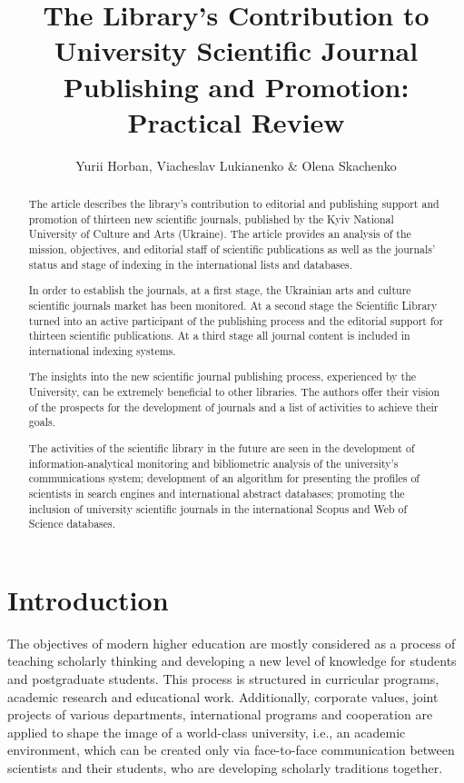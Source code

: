 \documentclass[a4paper,
fontsize=11pt,
oneside,
numbers=noperiodatend,
parskip=half-,
bibliography=totoc,
final
]{scrartcl}
\title{\LARGE{The Library’s Contribution to University Scientific Journal Publishing and Promotion: Practical Review}}%
\author{Yurii Horban, Viacheslav Lukianenko \& Olena Skachenko} %
\date{}
\begin{document}
\maketitle
\thispagestyle{fancyplain} 

\begin{abstract}
\noindent
The article describes the library's contribution to editorial and
publishing support and promotion of thirteen new scientific journals,
published by the Kyiv National University of Culture and Arts (Ukraine).
The article provides an analysis of the mission, objectives, and
editorial staff of scientific publications as well as the journals'
status and stage of indexing in the international lists and databases.

In order to establish the journals, at a first stage, the Ukrainian arts
and culture scientific journals market has been monitored. At a second
stage the Scientific Library turned into an active participant of the
publishing process and the editorial support for thirteen scientific
publications. At a third stage all journal content is included in
international indexing systems.

The insights into the new scientific journal publishing process,
experienced by the University, can be extremely beneficial to other
libraries. The authors offer their vision of the prospects for the
development of journals and a list of activities to achieve their goals.

The activities of the scientific library in the future are seen in the
development of information-analytical monitoring and bibliometric
analysis of the university's communications system; development of an
algorithm for presenting the profiles of scientists in search engines
and international abstract databases; promoting the inclusion of
university scientific journals in the international Scopus and Web of
Science databases.
\end{abstract}

\hypertarget{introduction}{%
\section{Introduction}\label{introduction}}

The objectives of modern higher education are mostly considered as a
process of teaching scholarly thinking and developing a new level of
knowledge for students and postgraduate students. This process is
structured in curricular programs, academic research and educational
work. Additionally, corporate values, joint projects of various
departments, international programs and cooperation are applied to shape
the image of a world-class university, i.e., an academic environment,
which can be created only via face-to-face communication between
scientists and their students, who are developing scholarly traditions
together.
\end{document}

